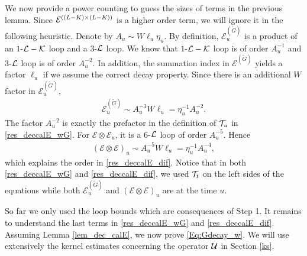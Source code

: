 \documentclass[10pt,reqno]{article}
\theoremstyle{plain} %
\theoremstyle{remark}
\numberwithin{equation}{section}
\begin{document}
We now provide a power counting to guess the sizes of terms in the previous lemma. Since 
$ {\cal E}^{( (L-K)\times(L-K) )}$ is a higher order term, we will ignore it in the following heuristic. 
Denote by $A_u \sim  W\ell_u\eta_u$. By definition, $\mathcal{E}^{( \widetilde{G} )}_u$ is a product of an $1$-$\cal L -\cal K$ loop and 
a $3$-$\cal L$ loop. We know that  $1$-$\cal L -\cal K$ loop is of order $A_u^{-1}$ and $3$-$\cal L$ loop is of order $A_u^{-2}$. In addition, 
the  summation index in $\mathcal{E}^{( \widetilde{G} )}$ yields a factor $\ell_u$ if we assume the correct decay property. Since there is an additional $W$ factor in $\mathcal{E}^{( \widetilde{G} )}_u$, 
\begin{align}
\mathcal{E}^{( \widetilde{G} )}_u \sim A_u^{-3} W \ell_u = \eta_u^{-1} A_u^{-2}.
\end{align}
The factor $A_u^{-2}$ is exactly the prefactor  in the definition of $ {\cal T}_u$ in \eqref{res_deccalE_wG}.  For $ \mathcal{E}\otimes  \mathcal{E}_u $, it is a $6$-$\cal L$ loop of order $A_u^{-5}$. Hence 
\begin{align}
(\mathcal{E}\otimes  \mathcal{E})_u \sim A_u^{-5} W \ell_u = \eta_u^{-1} A_u^{-4}, 
\end{align}
which explains the order in \eqref{res_deccalE_dif}.  Notice that in both \eqref{res_deccalE_wG} and  \eqref{res_deccalE_dif}, 
we used $ {\cal T}_t$ on the left sides of the equations while both $\mathcal{E}^{( \widetilde{G} )}_u$ and $(\mathcal{E}\otimes  \mathcal{E})_u$ are at the time $u$. 

So far we only used the loop bounds which are consequences of Step 1. 
It remains to understand the last terms in \eqref{res_deccalE_wG} and  \eqref{res_deccalE_dif}. Assuming  Lemma \ref{lem_dec_calE}, we now  prove  \eqref{Eq:Gdecay_w}. We will use extensively the kernel estimates concerning  the operator $\cal U$ in Section \ref{ks}. 
\end{document}
